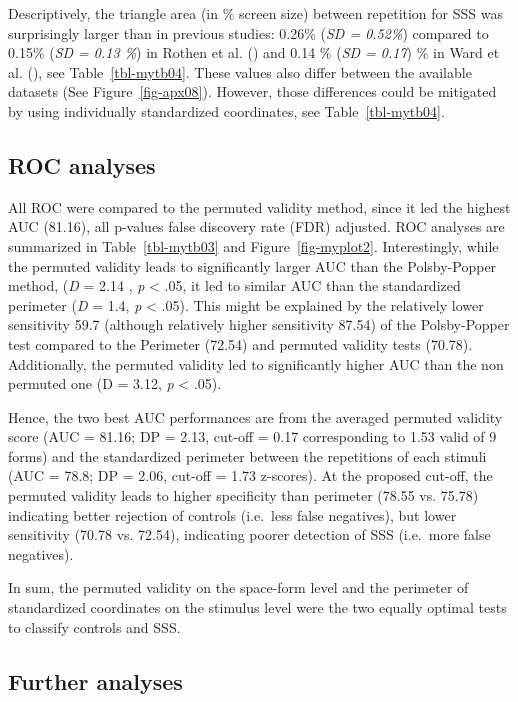\documentclass[
  man,
  longtable,
  a4paper,
  nolmodern,
  notxfonts,
  notimes,
  colorlinks=true,linkcolor=blue,citecolor=blue,urlcolor=blue]{apa7}
\begin{document}
Descriptively, the triangle area (in \% screen size) between repetition
for SSS was surprisingly larger than in previous studies: 0.26\%
(\emph{SD = 0.52\%}) compared to 0.15\% (\emph{SD = 0.13 \%}) in Rothen
et al. () and 0.14 \% (\emph{SD = 0.17})
\% in Ward et al. (), see
Table~\ref{tbl-mytb04}. These values also differ between the available
datasets (See Figure~\ref{fig-apx08}). However, those differences could
be mitigated by using individually standardized coordinates, see
Table~\ref{tbl-mytb04}.

\subsection{ROC analyses}\label{roc-analyses}

All ROC were compared to the permuted validity method, since it led the
highest AUC (81.16), all p-values false discovery rate (FDR) adjusted.
ROC analyses are summarized in Table~\ref{tbl-mytb03} and
Figure~\ref{fig-myplot2}. Interestingly, while the permuted validity
leads to significantly larger AUC than the Polsby-Popper method,
(\emph{D} = 2.14 , \emph{p} \textless{} .05, it led to similar AUC than
the standardized perimeter (\emph{D} = 1.4, \emph{p} \textless{} .05).
This might be explained by the relatively lower sensitivity 59.7
(although relatively higher sensitivity 87.54) of the Polsby-Popper test
compared to the Perimeter (72.54) and permuted validity tests (70.78).
Additionally, the permuted validity led to significantly higher AUC than
the non permuted one (D = 3.12, \emph{p} \textless{} .05).

Hence, the two best AUC performances are from the averaged permuted
validity score (AUC = 81.16; DP = 2.13, cut-off = 0.17 corresponding to
1.53 valid of 9 forms) and the standardized perimeter between the
repetitions of each stimuli (AUC = 78.8; DP = 2.06, cut-off = 1.73
z-scores). At the proposed cut-off, the permuted validity leads to
higher specificity than perimeter (78.55 vs. 75.78) indicating better
rejection of controls (i.e.~less false negatives), but lower sensitivity
(70.78 vs. 72.54), indicating poorer detection of SSS (i.e.~more false
negatives).

In sum, the permuted validity on the space-form level and the perimeter
of standardized coordinates on the stimulus level were the two equally
optimal tests to classify controls and SSS.

\subsection{Further analyses}\label{further-analyses}
\end{document}
